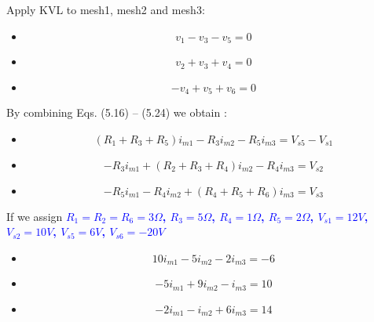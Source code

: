 \documentclass[a4 paper]{article}
\newcommand{\blue}[1]{\textcolor{blue}{#1}}
\numberwithin{equation}{section}
\newcommand{\0}{\mathbf{0}}
\begin{document}
Apply KVL to mesh1, mesh2 and mesh3:

\begin{itemize} \itemsep1pt \parskip0pt  
  \item[] \hspace{6.6 cm}\begin{equation}v_1 - v_3 - v_5 = 0\end{equation}
  \item[] \hspace{6.6 cm}\begin{equation}v_2 + v_3 + v_4 = 0\end{equation}
  \item[] \hspace{6.6 cm}\begin{equation}-v_4 + v_5 + v_6 = 0\end{equation}
\end{itemize}


By combining Eqs. (5.16) -- (5.24) we obtain :

\begin{itemize} \itemsep1pt \parskip0pt  
  \item[] \hspace{6.6 cm}\begin{equation}(R_1 + R_3 + R_5)i_{m1} - R_3i_{m2} - R_5i_{m3} = V_{s5} - V_{s1}\end{equation}
  \item[] \hspace{6.6 cm}\begin{equation}-R_3i_{m1} + (R_2 + R_3 +R_4)i_{m2} - R_4i_{m3} = V_{s2}\end{equation}
  \item[] \hspace{6.6 cm}\begin{equation}-R_5i_{m1} - R_4i_{m2} + (R_4 + R_5 + R_6)i_{m3} = V_{s3}\end{equation}
\end{itemize}

If we assign \blue{\bf $R_1 = R_2 = R_6 =3\Omega$, $R_3 = 5\Omega$, $R_4 = 1\Omega$, $R_5 = 2\Omega$, $V_{s1} = 12V$, $V_{s2} = 10V$, $V_{s5} = 6V$, $V_{s6} = -20V$}


\begin{itemize} \itemsep1pt \parskip0pt  
  \item[] \hspace{6.6 cm}\begin{equation}10i_{m1} - 5i_{m2} - 2i_{m3} = -6\end{equation}
  \item[] \hspace{6.6 cm}\begin{equation}-5i_{m1} + 9i_{m2} - i_{m3} = 10\end{equation}
  \item[] \hspace{6.6 cm}\begin{equation}-2i_{m1} - i_{m2} + 6i_{m3} = 14\end{equation}
\end{itemize}
\end{document}
